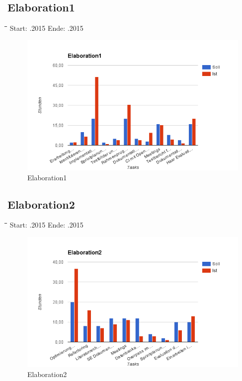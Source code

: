 \subsection{Elaboration1}
\begin{tabbing}[H]
    \hspace*{3cm}\=\hspace*{5cm}\=\hspace*{3cm}\=\hspace*{3cm}\= \kill
    Start: .2015 \> Ende: .2015 \\
\end{tabbing}
\begin{figure}[H]
\includegraphics[width=390pt]{images/elab1.png}
\caption[Elaboration1]{Elaboration1}
\end{figure}

\subsection{Elaboration2}
\begin{tabbing}[H]
    \hspace*{3cm}\=\hspace*{5cm}\=\hspace*{3cm}\=\hspace*{3cm}\= \kill
    Start: .2015 \> Ende: .2015 \\
\end{tabbing}
\begin{figure}[H]
\centering
\includegraphics[width=390pt]{images/elab2.png}
\caption[Elaboration2]{Elaboration2}
\end{figure}

